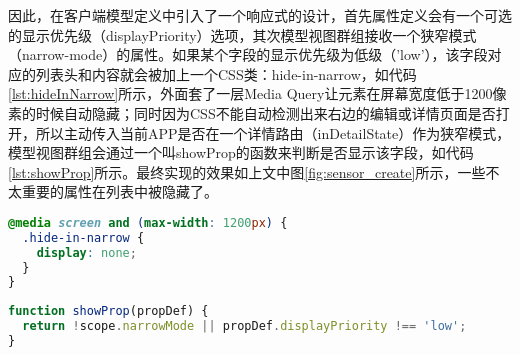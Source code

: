 因此，在客户端模型定义中引入了一个响应式的设计，首先属性定义会有一个可选的显示优先级（displayPriority）选项，其次模型视图群组接收一个狭窄模式（narrow-mode）的属性。如果某个字段的显示优先级为低级（'low'），该字段对应的列表头和内容就会被加上一个CSS类：hide-in-narrow，如代码\ref{lst:hideInNarrow}所示，外面套了一层Media Query让元素在屏幕宽度低于1200像素的时候自动隐藏；同时因为CSS不能自动检测出来右边的编辑或详情页面是否打开，所以主动传入当前APP是否在一个详情路由（inDetailState）作为狭窄模式，模型视图群组会通过一个叫showProp的函数来判断是否显示该字段，如代码\ref{lst:showProp}所示。最终实现的效果如上文中图\ref{fig:sensor_create}所示，一些不太重要的属性在列表中被隐藏了。
\begin{lstlisting}[language={CSS}, label={lst:hideInNarrow}, caption={CSS类hide-in-narrow的代码}]
@media screen and (max-width: 1200px) {
  .hide-in-narrow {
    display: none;
  }
}
\end{lstlisting}

\begin{lstlisting}[language={JavaScript}, label={lst:showProp}, caption={传感器列表页面中的模型输入群组代码}]
function showProp(propDef) {
  return !scope.narrowMode || propDef.displayPriority !== 'low';
}
\end{lstlisting}
